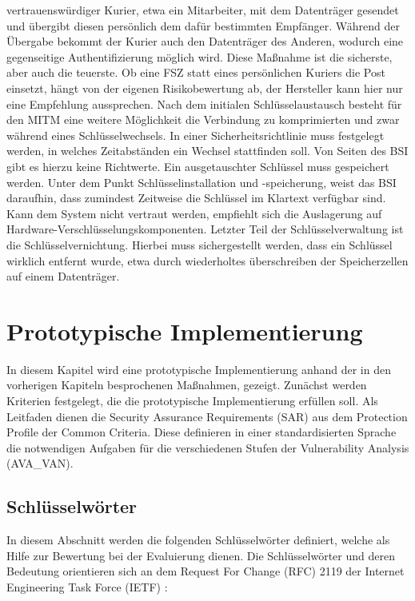 \documentclass[11pt,a4paper]{report}
\begin{document}
vertrauenswürdiger Kurier, etwa ein Mitarbeiter, mit dem Datenträger gesendet und übergibt diesen persönlich dem dafür bestimmten Empfänger. Während der Übergabe bekommt der Kurier auch den Datenträger des Anderen, wodurch eine gegenseitige Authentifizierung möglich wird. Diese Maßnahme ist die sicherste, aber auch die teuerste. Ob eine FSZ statt eines persönlichen Kuriers die Post einsetzt, hängt von der eigenen Risikobewertung ab, der Hersteller kann hier nur eine Empfehlung aussprechen. Nach dem initialen Schlüsselaustausch besteht für den MITM eine weitere Möglichkeit die Verbindung zu komprimierten und zwar während eines Schlüsselwechsels. In einer Sicherheitsrichtlinie muss festgelegt werden, in welches Zeitabständen ein Wechsel stattfinden soll. Von Seiten des BSI gibt es hierzu keine Richtwerte. Ein ausgetauschter Schlüssel muss gespeichert werden. Unter dem Punkt Schlüsselinstallation und -speicherung, weist das BSI daraufhin, dass zumindest Zeitweise die Schlüssel im Klartext verfügbar sind. Kann dem System nicht vertraut werden, empfiehlt sich die Auslagerung auf Hardware-Verschlüsselungskomponenten. Letzter Teil der Schlüsselverwaltung ist die Schlüsselvernichtung. Hierbei muss sichergestellt werden, dass ein Schlüssel wirklich entfernt wurde, etwa durch wiederholtes überschreiben der Speicherzellen auf einem Datenträger.

\chapter{Prototypische Implementierung} \label{chap:implementation}

In diesem Kapitel wird eine prototypische Implementierung anhand der in den vorherigen Kapiteln besprochenen Maßnahmen, gezeigt. Zunächst werden Kriterien festgelegt, die die prototypische Implementierung erfüllen soll. Als Leitfaden dienen die Security Assurance Requirements (SAR) aus dem Protection Profile der Common Criteria. Diese definieren in einer standardisierten Sprache die notwendigen Aufgaben für die verschiedenen Stufen der Vulnerability Analysis (AVA\_VAN).

\section{Schlüsselwörter}

In diesem Abschnitt werden die folgenden Schlüsselwörter definiert, welche als Hilfe zur Bewertung bei der Evaluierung dienen. Die Schlüsselwörter und deren Bedeutung orientieren sich an dem Request For Change (RFC) 2119 der Internet Engineering Task Force (IETF) \cite{rfc_2119}:
\end{document}
